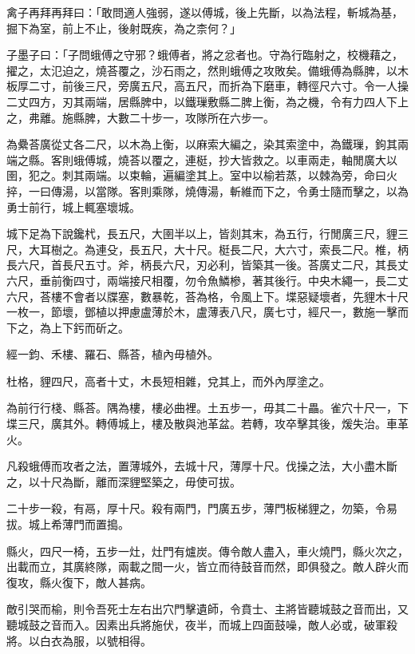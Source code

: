 
\begin{pinyinscope}
禽子再拜再拜曰：「敢問適人強弱，遂以傅城，後上先斷，以為法程，斬城為基，掘下為室，前上不止，後射既疾，為之柰何？」

子墨子曰：「子問蛾傅之守邪？蛾傅者，將之忿者也。守為行臨射之，校機藉之，擢之，太氾迫之，燒荅覆之，沙石雨之，然則蛾傅之攻敗矣。備蛾傅為縣脾，以木板厚二寸，前後三尺，旁廣五尺，高五尺，而折為下磨車，轉徑尺六寸。令一人操二丈四方，刃其兩端，居縣脾中，以鐵璅敷縣二脾上衡，為之機，令有力四人下上之，弗離。施縣脾，大數二十步一，攻隊所在六步一。

為纍荅廣從丈各二尺，以木為上衡，以麻索大編之，染其索塗中，為鐵璅，鉤其兩端之縣。客則蛾傅城，燒荅以覆之，連梃，抄大皆救之。以車兩走，軸閒廣大以圉，犯之。刺其兩端。以束輪，遍編塗其上。室中以榆若蒸，以棘為旁，命曰火捽，一曰傳湯，以當隊。客則乘隊，燒傳湯，斬維而下之，令勇士隨而擊之，以為勇士前行，城上輒塞壞城。

城下足為下說鑱杙，長五尺，大圉半以上，皆剡其末，為五行，行閒廣三尺，貍三尺，大耳樹之。為連殳，長五尺，大十尺。梃長二尺，大六寸，索長二尺。椎，柄長六尺，首長尺五寸。斧，柄長六尺，刃必利，皆築其一後。荅廣丈二尺，其長丈六尺，垂前衡四寸，兩端接尺相覆，勿令魚鱗槮，著其後行。中央木繩一，長二丈六尺，荅樓不會者以牒塞，數暴乾，荅為格，令風上下。堞惡疑壞者，先貍木十尺一枚一，節壞，鄧植以押慮盧薄於木，盧薄表八尺，廣七寸，經尺一，數施一擊而下之，為上下釫而斫之。

經一鈞、禾樓、羅石、縣荅，植內毋植外。

杜格，貍四尺，高者十丈，木長短相雜，兌其上，而外內厚塗之。

為前行行棧、縣荅。隅為樓，樓必曲裡。土五步一，毋其二十畾。雀穴十尺一，下堞三尺，廣其外。轉傅城上，樓及散與池革盆。若轉，攻卒擊其後，煖失治。車革火。

凡殺蛾傅而攻者之法，置薄城外，去城十尺，薄厚十尺。伐操之法，大小盡木斷之，以十尺為斷，離而深貍堅築之，毋使可拔。

二十步一殺，有鬲，厚十尺。殺有兩門，門廣五步，薄門板梯貍之，勿築，令易拔。城上希薄門而置搗。

縣火，四尺一椅，五步一灶，灶門有爐炭。傳令敵人盡入，車火燒門，縣火次之，出載而立，其廣終隊，兩載之間一火，皆立而待鼓音而然，即俱發之。敵人辟火而復攻，縣火復下，敵人甚病。

敵引哭而榆，則令吾死士左右出穴門擊遺師，令賁士、主將皆聽城鼓之音而出，又聽城鼓之音而入。因素出兵將施伏，夜半，而城上四面鼓噪，敵人必或，破軍殺將。以白衣為服，以號相得。


\end{pinyinscope}